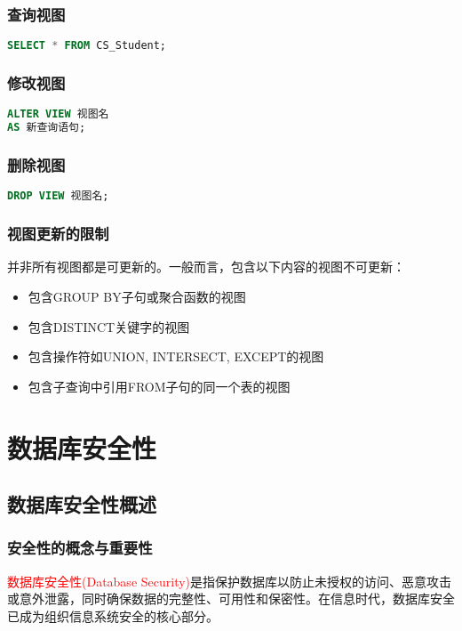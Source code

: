 \documentclass{../../note}
\begin{document}
\subsubsection{查询视图}
\begin{lstlisting}[language=SQL]
SELECT * FROM CS_Student;
\end{lstlisting}

\subsubsection{修改视图}
\begin{lstlisting}[language=SQL]
ALTER VIEW 视图名
AS 新查询语句;
\end{lstlisting}

\subsubsection{删除视图}
\begin{lstlisting}[language=SQL]
DROP VIEW 视图名;
\end{lstlisting}

\subsubsection{视图更新的限制}
并非所有视图都是可更新的。一般而言，包含以下内容的视图不可更新：
\begin{itemize}
    \item 包含GROUP BY子句或聚合函数的视图
    \item 包含DISTINCT关键字的视图
    \item 包含操作符如UNION, INTERSECT, EXCEPT的视图
    \item 包含子查询中引用FROM子句的同一个表的视图
\end{itemize}


\section{数据库安全性}

\subsection{数据库安全性概述}

\subsubsection{安全性的概念与重要性}
\textcolor{red}{数据库安全性(Database Security)}是指保护数据库以防止未授权的访问、恶意攻击或意外泄露，同时确保数据的完整性、可用性和保密性。在信息时代，数据库安全已成为组织信息系统安全的核心部分。
\end{document}
